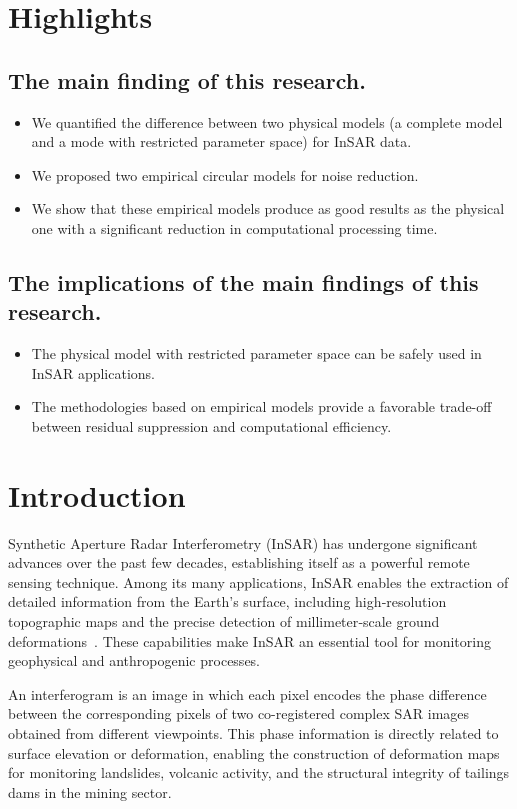 \documentclass[remotesensing,article,submit,pdftex,moreauthors]{Definitions/mdpi}
\begin{document}
\section*{Highlights}

\subsection*{The main finding of this research.}
\begin{itemize}[label=$\bullet$]
	\item We quantified the difference between two physical models (a complete model and a mode with restricted parameter space) for InSAR data.
    \item We proposed two empirical circular models for noise reduction.
    \item We show that these empirical models produce as good results as the physical one with a significant reduction in computational processing time.
\end{itemize}
%
\subsection*{The implications of the main findings of this research.}
\begin{itemize}[label=$\bullet$]
    \item The physical model with restricted parameter space can be safely used in InSAR applications.
    \item The methodologies based on empirical models provide a favorable trade-off between residual suppression and computational efficiency.
\end{itemize}
%
\section{Introduction}\label{sec:intro}
Synthetic Aperture Radar Interferometry (InSAR) has undergone significant advances over the past few decades, establishing itself as a powerful remote sensing technique. 
Among its many applications, InSAR enables the extraction of detailed information from the Earth’s surface, including high‑resolution topographic maps and the precise detection of millimeter‑scale ground deformations~\cite{InterferometricSyntheticApertureRadarStatisticalInference}. 
These capabilities make InSAR an essential tool for monitoring geophysical and anthropogenic processes.

An interferogram is an image in which each pixel encodes the phase difference between the corresponding pixels of two co-registered complex SAR images obtained from different viewpoints.
This phase information is directly related to surface elevation or deformation, enabling the construction of deformation maps for monitoring landslides, volcanic activity, and the structural integrity of tailings dams in the mining sector.
\end{document}
